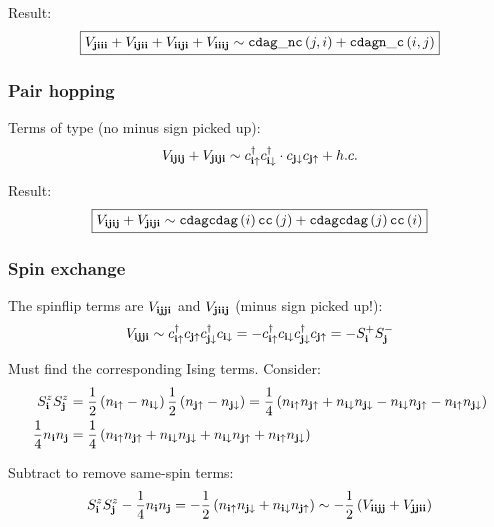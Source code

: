\documentclass[12pt,paper=a4]{article}
\newcommand{\cUP}[1]{c_{#1\uparrow}}
\newcommand{\cdagUP}[1]{c^{\dagger}_{#1\uparrow}}
\newcommand{\cDN}[1]{c_{#1\downarrow}}
\newcommand{\cdagDN}[1]{c^{\dagger}_{#1\downarrow}}
\newcommand{\nUP}[1]{n_{#1\uparrow}}
\newcommand{\nDN}[1]{n_{#1\downarrow}}
\begin{document}
Result:
\begin{equation}
\boxed{ V_{\mathbf{jiii}} + V_{\mathbf{ijii}} + V_{\mathbf{iiji}} + V_{\mathbf{iiij}} \sim \mathtt{cdag\_nc}\left(j,i\right) + \mathtt{cdagn\_c}\left(i,j\right) }
\end{equation}

\subsubsection{Pair hopping}

Terms of type (no minus sign picked up):
\begin{equation}
V_{\v{ijij}} + V_{\v{jiji}} \sim \cdagUP{\v{i}} \cdagDN{\v{i}} \cdot \cDN{\v{j}} \cUP{\v{j}} + h.c.
\end{equation}

Result:
\begin{equation}
\boxed{ V_{\mathbf{ijij}} + V_{\mathbf{jiji}} \sim \mathtt{cdagcdag}\left(i\right)\mathtt{cc}\left(j\right) + \mathtt{cdagcdag}\left(j\right)\mathtt{cc}\left(i\right)
}
\end{equation}

\subsubsection{Spin exchange}

The spinflip terms are $V_{\mathbf{ijji}}$ and $V_{\mathbf{jiij}}$ (minus sign picked up!):
\begin{equation}
V_{\v{ijji}} \sim \cdagUP{\v{i}} \cUP{\v{j}} \cdagDN{\v{j}} \cDN{\v{i}} = -\cdagUP{\v{i}}\cDN{\v{i}} \cdagDN{\v{j}}\cUP{\v{j}} = -S^+_{\v{i}} S^-_{\v{j}}
\end{equation}

Must find the corresponding Ising terms. Consider:
\begin{equation}
\begin{split}
S^z_{\v{i}} S^z_{\v{j}} 
&= \frac{1}{2} \lr{\nUP{\v{i}}-\nDN{\v{i}}} \frac{1}{2}\lr{\nUP{\v{j}}-\nDN{\v{j}}}
= \frac{1}{4} \lr{ \nUP{\v{i}}\nUP{\v{j}} + \nDN{\v{i}}\nDN{\v{j}} -\nDN{\v{i}}\nUP{\v{j}} -\nUP{\v{i}}\nDN{\v{j}} }\\
\frac{1}{4} n_{\v{i}}n_{\v{j}} &= \frac{1}{4} \lr{ \nUP{\v{i}}\nUP{\v{j}} + \nDN{\v{i}}\nDN{\v{j}} +\nDN{\v{i}}\nUP{\v{j}} +\nUP{\v{i}}\nDN{\v{j}} }
\end{split}
\end{equation}

Subtract to remove same-spin terms:
\begin{equation}
S^z_{\v{i}} S^z_{\v{j}} - \frac{1}{4} n_{\v{i}}n_{\v{j}}
= -\frac{1}{2} \lr{ \nUP{\v{i}}\nDN{\v{j}} + \nDN{\v{i}}\nUP{\v{j}} }
\sim -\frac{1}{2} \lr{V_{\v{iijj}} + V_{\v{jjii}}}
\end{equation}
\end{document}
